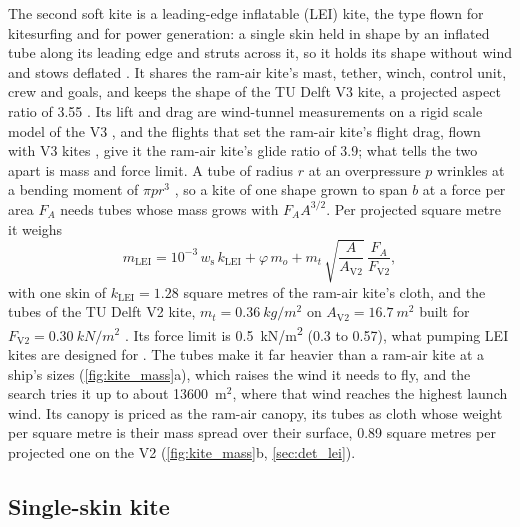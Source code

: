 The second soft kite is a leading-edge inflatable (LEI) kite, the type flown for kitesurfing and for power generation: a single skin held in shape by an inflated tube along its leading edge and struts across it, so it holds its shape without wind and stows deflated \citep{vandervlugt2013}. It shares the ram-air kite's mast, tether, winch, control unit, crew and goals, and keeps the shape of the TU Delft V3 kite, a projected aspect ratio of 3.55 \citep{poland2025}. Its lift and drag are wind-tunnel measurements on a rigid scale model of the V3 \citep{poland2025}, and the flights that set the ram-air kite's flight drag, flown with V3 kites \citep{vandervlugt2019}, give it the ram-air kite's glide ratio of 3.9; what tells the two apart is mass and force limit. A tube of radius $r$ at an overpressure $p$ wrinkles at a bending moment of $\pi p r^3$ \citep{schwoll2012}, so a kite of one shape grown to span $b$ at a force per area $F_A$ needs tubes whose mass grows with $F_A A^{3/2}$. Per projected square metre it weighs
\begin{equation}
m_\mathrm{LEI} = 10^{-3}\,w_\mathrm{s}\,k_\mathrm{LEI} + \varphi\,m_o + m_t\,\sqrt{\frac{A}{A_\mathrm{V2}}}\,\frac{F_A}{F_\mathrm{V2}},
\label{eq:lei_mass}
\end{equation}
with one skin of $k_\mathrm{LEI}=1.28$ square metres of the ram-air kite's cloth, and the tubes of the TU Delft V2 kite, $m_t=\SI{0.36}{kg/m^2}$ on $A_\mathrm{V2}=\SI{16.7}{m^2}$ built for $F_\mathrm{V2}=\SI{0.30}{kN/m^2}$ \citep{schwoll2012,vandervlugt2013}. Its force limit is \SI{0.5}{kN/m^2} (0.3 to 0.57), what pumping LEI kites are designed for \citep{kitepower2024,faggiani2018}. The tubes make it far heavier than a ram-air kite at a ship's sizes (\cref{fig:kite_mass}a), which raises the wind it needs to fly, and the search tries it up to about \num{13600}~m$^2$, where that wind reaches the highest launch wind. Its canopy is priced as the ram-air canopy, its tubes as cloth whose weight per square metre is their mass spread over their surface, 0.89 square metres per projected one on the V2 \citep{schwoll2012} (\cref{fig:kite_mass}b, \cref{sec:det_lei}).

\subsection{Single-skin kite}
\label{sec:single_skin_kite}

